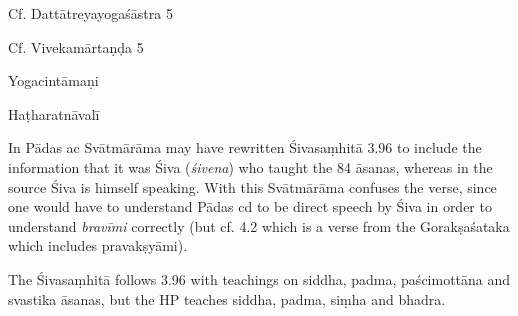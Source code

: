 \begin{ekdosis}
\begin{sources}[hp01_033]
Cf. Dattātreyayogaśāstra 5

\begin{versinnote}
\end{versinnote}

Cf. Vivekamārtaṇḍa 5

\begin{versinnote}
\end{versinnote}

\end{sources}

\begin{testimonia}[hp01_033]
Yogacintāmaṇi

\begin{versinnote}
\end{versinnote}

Haṭharatnāvalī

\begin{versinnote}
\end{versinnote}

\end{testimonia}

\begin{philcomm}[hp01_033]
In Pādas ac Svātmārāma may have rewritten Śivasaṃhitā 3.96 to include the information that it was Śiva (\emph{śivena}) who taught the 84 āsanas, whereas in the source Śiva is himself speaking. With this
Svātmārāma confuses the verse, since one would have to understand Pādas cd to be direct speech by Śiva in order to understand \emph{bravīmi} correctly (but cf. 4.2 which is a verse from the Gorakṣaśataka which includes pravakṣyāmi).

The Śivasaṃhitā follows 3.96 with teachings on siddha, padma, paścimottāna and svastika āsanas, but the HP teaches siddha, padma, siṃha and bhadra.


\end{philcomm}
\end{ekdosis}
